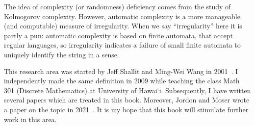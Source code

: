 	The idea of complexity (or randomness) deficiency comes from the study of Kolmogorov complexity.
	However, automatic complexity is a more manageable (and computable) measure of irregularity.
	When we say ``irregularity'' here it is partly a pun:
	automatic complexity is based on finite automata, that accept regular languages,
	so irregularity indicates a failure of small finite automata to uniquely identify the string in a sense.


	This research area was started by Jeff Shallit and Ming-Wei Wang in 2001~\cite{MR1897300}.
	I independently made the same definition in 2009 while teaching the class Math 301 (Discrete Mathematics) at
	University of Hawai\textquoteleft i. Subsequently, I have written several papers which are treated in this book.
	Moreover, Jordon and Moser wrote a paper on the topic in 2021~\cite{DBLP:conf/fsttcs/JordonM21}. It is my hope that this book will stimulate further work in this area.

